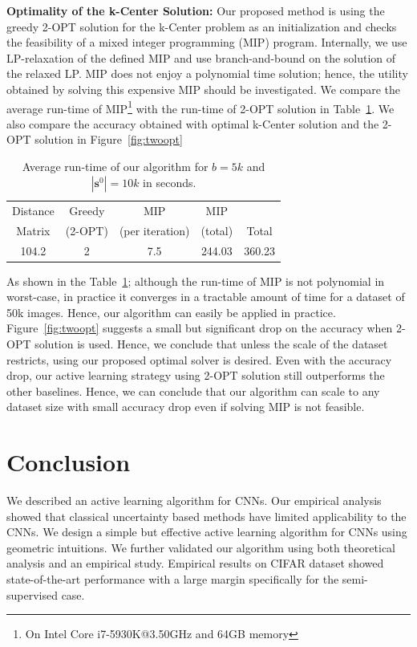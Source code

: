 \documentclass{article}
\begin{document}
\noindent\textbf{Optimality of the k-Center Solution:} Our proposed method is using the greedy 2-OPT solution for the k-Center problem as an initialization and checks the feasibility of a mixed integer programming (MIP) program. Internally, we use LP-relaxation of the defined MIP and use branch-and-bound on the solution of the relaxed LP. MIP does not enjoy a polynomial time solution; hence, the utility obtained by solving this expensive MIP should be investigated. We compare the average run-time of MIP\footnote{On Intel Core i7-5930K@3.50GHz and 64GB memory} with the run-time of 2-OPT solution in Table~\ref{tab:runtime}. We also compare the accuracy obtained with optimal k-Center solution and the 2-OPT solution in Figure~\ref{fig:twoopt}


\begin{table}[ht]
\centering
\vspace{-3mm}
\caption{Average run-time of our algorithm for $b=5k$ and $|\mathbf{s}^0|=10k$ in seconds.}
\begin{tabular}{ccccc} \toprule
 Distance& Greedy & MIP & MIP &  \\
Matrix &(2-OPT) & (per iteration) & (total) & Total \\ \midrule
104.2  & 2   & 7.5  &  244.03  & 360.23  \\ \bottomrule
\end{tabular}
\label{tab:runtime}
\vspace{-2mm}
\end{table}

As shown in the Table~\ref{tab:runtime}; although the run-time of MIP is not polynomial in worst-case, in practice it converges in a tractable amount of time for a dataset of 50k images. Hence, our algorithm can easily be applied in practice. Figure~\ref{fig:twoopt} suggests a small but significant drop on the accuracy when 2-OPT solution is used. Hence, we conclude that unless the scale of the dataset restricts, using our proposed optimal solver is desired. Even with the accuracy drop, our active learning strategy using 2-OPT solution still outperforms the other baselines. Hence, we can conclude that our algorithm can scale to any dataset size with small accuracy drop even if solving MIP is not feasible.

\section{Conclusion}
We described an active learning algorithm for CNNs. Our empirical analysis showed that classical uncertainty based methods have limited applicability to the CNNs. We design a simple but effective active learning algorithm for CNNs using geometric intuitions. We further validated our algorithm using both theoretical analysis and an empirical study. Empirical results on CIFAR\cite{cifar} dataset showed state-of-the-art performance with a large margin specifically for the semi-supervised case.
\end{document}
